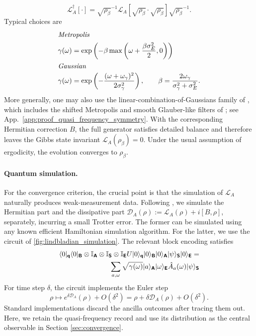 \documentclass[showpacs,amsmath,amssymb,twocolumn,prx,superscriptaddress,10pt,aps,nofootinbib]{revtex4-2}
\DeclarePairedDelimiter\bra{\langle}{|}
\DeclarePairedDelimiter\ket{|}{\rangle}
\newcommand{\bbI}{\mathbb{I}}
\newcommand{\rS}{\boldsymbol{\mathsf{S}}}
\newcommand{\rE}{\boldsymbol{\mathsf{E}}}
\newcommand{\rA}{\boldsymbol{\mathsf{A}}}
\newcommand{\rB}{\boldsymbol{\mathsf{B}}}
\newcommand{\rqq}{\boldsymbol{\mathsf{q}}}
\begin{document}
\begin{equation}
\label{eq:KMS_DB}
        \mathcal{L}_A^{\dagger}[\cdot]={\sqrt{\rho_\beta}}^{-1} \mathcal{L}_A\left[\sqrt{\rho_\beta} \cdot \sqrt{\rho_\beta}\right]{\sqrt{\rho_\beta}}^{-1}.
\end{equation}
Typical choices are
\begin{align}
\shortintertext{\textit{Metropolis}}
\gamma(\omega)
&=
\exp\left(-\beta \max\left(\omega+\frac{\beta\sigma_E^2}{2},0\right)\right)
\label{eq:Metropolis_transition_rate}
\\
\shortintertext{\textit{Gaussian}}
\gamma(\omega)
&=
\exp\left(-\frac{(\omega+\omega_\gamma)^2}{2\sigma_\gamma^2}\right),
\qquad
\beta=\frac{2\omega_\gamma}{\sigma_\gamma^2+\sigma_E^2}.
\label{eq:Gaussian_transition_rate}
\end{align}
More generally, one may also use the linear-combination-of-Gaussians family of \cite[Cor.~II.3]{Chen2023a}, which includes the shifted Metropolis and smooth Glauber-like filters of \cite[Prop.~II.4]{Chen2023a}; see App.~\ref{app:proof_quasi_frequency_symmetry}. With the corresponding Hermitian correction $B$, the full generator satisfies detailed balance and therefore leaves the Gibbs state invariant $\mathcal{L}_A(\rho_\beta)=0$. Under the usual assumption of ergodicity, the evolution converges to $\rho_\beta$.


\paragraph{Quantum simulation.} For the convergence criterion, the crucial point is that the simulation of $\mathcal{L}_A$ naturally produces weak-measurement data. Following \cite{Chen2023a}, we simulate the Hermitian part and the dissipative part $\mathcal{D}_A(\rho):=\mathcal{L}_A(\rho)+i[B,\rho]$, separately, incurring a small Trotter error. The former can be simulated using any known efficient Hamiltonian simulation algorithm. For the latter, we use the circuit of \autoref{fig:lindbladian_simulation}. The relevant block encoding satisfies
\begin{align}
\label{eq:block_encoding_jumps_algorithmic}
\bra{0}_{\rqq}\bra{0}_{\rB} \otimes \bbI_{\rA}\otimes\bbI_{\rS}\otimes \bbI_{\rE} U \ket{0}_{\rqq}\ket{0}_{\rB} \ket{0}_{\rA}\ket{\psi}_{\rS}\ket{0}_{\rE} = \nonumber \\ 
\sum_{a, \omega} \sqrt{\gamma(\omega)}  \ket{a}_{\rA}\ket{\omega}_{\rE} \hat{A}_a(\omega)\ket{\psi}_{\rS}
\end{align}
For time step $\delta$, the circuit implements the Euler step
\begin{equation}
\rho \mapsto e^{\delta\mathcal{D}_A}(\rho)+O(\delta^2)
=
\rho+\delta\mathcal{D}_A(\rho)+O(\delta^2).
\end{equation}
Standard implementations discard the ancilla outcomes after tracing them out. Here, we retain the quasi-frequency record and use its distribution as the central observable in Section \ref{sec:convergence}.
\end{document}
